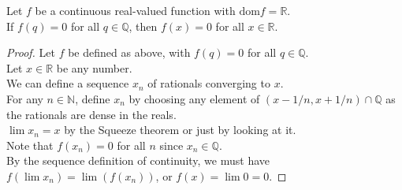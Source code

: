 \documentclass{article}
\newenvironment{theorem}[1]{\renewcommand\theinnercustomthm{#1}\innercustomthm}
  {\endinnercustomthm}
\begin{document}
\newpage{}
\begin{theorem}{5}
    Let $f$ be a continuous real-valued function with $\mathrm{dom} f = \mathbb R$. \\
    If $f(q) = 0$ for all $q \in \mathbb Q$, then $f(x) = 0$ for all $x \in \mathbb R$.
\end{theorem}
\begin{proof}
    Let $f$ be defined as above, with $f(q) = 0$ for all $q \in \mathbb Q$. \\
    Let $x \in \mathbb R$ be any number. \\
    We can define a sequence $x_n$ of rationals converging to $x$. \\
    For any $n \in \mathbb N$, define $x_n$ by choosing any element of $(x-1/n, x+1/n) \cap \mathbb Q$ as the rationals are dense in the reals. \\
    $\lim x_n =x$ by the Squeeze theorem or just by looking at it. \\
    Note that $f(x_n) = 0$ for all $n$ since $x_n \in \mathbb Q$. \\
    By the sequence definition of continuity, we must have $f(\lim x_n) = \lim (f(x_n))$, or $f(x) = \lim 0 = 0$.
\end{proof}
\end{document}

